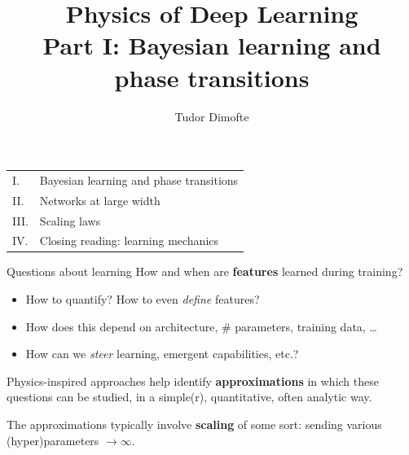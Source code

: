 \documentclass[11pt]{beamer}
\author{Tudor Dimofte}
\institute{Iliad Intensive (Sept. 2026)}
\date{}
\newcommand{\hl}[1]{{\color{blue!60!black}\textbf{#1}}}
\begin{document}
\title{Physics of Deep Learning\\[2pt]
\large Part I: Bayesian learning and phase transitions}
\begin{frame}
  \titlepage
  \begin{center}\small
  \begin{tabular}{ll}
    I. & Bayesian learning and phase transitions \\
    II. & Networks at large width \\
    III. & Scaling laws \\
    IV. & Closing reading: learning mechanics
  \end{tabular}
  \end{center}
\end{frame}

\begin{frame}{Questions about learning}
  How and when are \hl{features} learned during training?
  \begin{itemize}
    \item How to quantify? How to even \emph{define} features?
    \item How does this depend on architecture, \# parameters, training data, \dots
    \item How can we \emph{steer} learning, emergent capabilities, etc.?
  \end{itemize}
  \vspace{4mm}

  Physics-inspired approaches help identify \hl{approximations} in which
  these questions can be studied, in a simple(r), quantitative, often
  analytic way.
  \vspace{3mm}

  The approximations typically involve \hl{scaling} of some sort:
  sending various (hyper)parameters $\to\infty$.
  
  \medskip
  
\end{frame}
\end{document}
